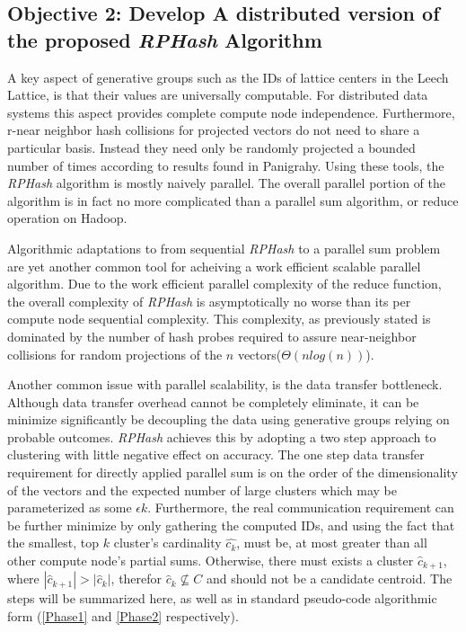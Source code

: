 \documentclass[a4paper,10pt]{article}
\begin{document}
\subsection{Objective 2:  Develop A distributed version of the proposed
\emph{RPHash} Algorithm} A key aspect of generative groups such as the
IDs of lattice centers in the Leech Lattice, is that their values are
universally computable.  For distributed data systems this aspect provides
complete compute node independence.  Furthermore, r-near neighbor hash
collisions for projected vectors do not need to share a particular basis.
Instead they need only be randomly projected a bounded number of times
according to results found in Panigrahy\cite{panigrahy}.  Using these tools,
the \emph{RPHash} algorithm is mostly naively parallel.  The overall parallel
portion of the algorithm is in fact no more complicated than a parallel sum
algorithm, or reduce operation on Hadoop.  

Algorithmic adaptations to from sequential \emph{RPHash} to a parallel 
sum problem are yet another common
tool for acheiving a work efficient scalable parallel algorithm.
Due to the work efficient parallel complexity of the reduce function, the
overall complexity of \emph{RPHash} is asymptotically no worse than its per
compute node sequential complexity.  This complexity, as previously stated
is dominated by the number of hash probes required to assure near-neighbor
collisions for random projections of the $n$ vectors($\Theta(nlog(n))$).  

Another common issue with parallel scalability,
is the data transfer bottleneck.  Although data transfer overhead cannot be
completely eliminate, it can be minimize significantly be decoupling the
data using generative groups relying on probable outcomes.  \emph{RPHash}
achieves this by adopting a two step approach to clustering with little
negative effect on accuracy.  The one step data transfer requirement for
directly applied parallel sum is on the order of the dimensionality of the
vectors and the expected number of large clusters which may be parameterized
as some $\epsilon k$.  Furthermore, the real communication requirement can be 
further minimize by only gathering the computed IDs, and using the fact that 
the smallest, top $k$ cluster's cardinality $\hat{c_{k}}$, must be, at most
greater than all other compute node's partial sums.  Otherwise, there must
exists a cluster $\hat{c}_{k+1}$, where $|\hat{c}_{k+1}| > |\hat{c}_{k}|$,
therefor $\hat{c}_{k}\nsubseteq C$ and should not be a candidate centroid.
The steps will be summarized here, as well as in standard pseudo-code
algorithmic form (\ref{Phase1} and \ref{Phase2} respectively).
\end{document}
